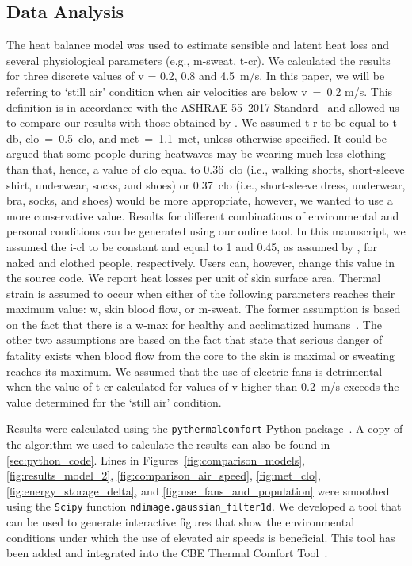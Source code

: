 \subsection{Data Analysis}\label{subsec:data-analysis}

The heat balance model was used to estimate sensible and latent heat loss and several physiological parameters (e.g., \ac{m-sweat}, \ac{t-cr}).
We calculated the results for three discrete values of \ac{v} = 0.2, 0.8 and 4.5~m/s.
In this paper, we will be referring to `still air' condition when air velocities are below \ac{v}~=~0.2 m/s.
This definition is in accordance with the ASHRAE 55--2017 Standard~\cite{ashrae552017} and allowed us to compare our results with those obtained by .
We assumed \ac{t-r} to be equal to \ac{t-db}, \ac{clo}~=~0.5~clo, and \ac{met}~=~1.1~met, unless otherwise specified.
It could be argued that some people during heatwaves may be wearing much less clothing than that, hence, a value of \ac{clo} equal to 0.36~clo (i.e., walking shorts, short-sleeve shirt, underwear, socks, and shoes) or 0.37~clo (i.e., short-sleeve dress, underwear, bra, socks, and shoes) would be more appropriate, however, we wanted to use a more conservative value.
Results for different combinations of environmental and personal conditions can be generated using our online tool.
In this manuscript, we assumed the \ac{i-cl} to be constant and equal to 1 and 0.45, as assumed by , for naked and clothed people, respectively.
Users can, however, change this value in the source code.
We report heat losses per unit of skin surface area.
Thermal strain is assumed to occur when either of the following parameters reaches their maximum value: \ac{w}, skin blood flow, or \ac{m-sweat}.
The former assumption is based on the fact that there is a \ac{w-max} for healthy and acclimatized humans~\cite{ASHRA2017}.
The other two assumptions are based on the fact that  state that serious danger of fatality exists when blood flow from the core to the skin is maximal or sweating reaches its maximum.
We assumed that the use of electric fans is detrimental when the value of \ac{t-cr} calculated for values of \ac{v} higher than 0.2~m/s exceeds the value determined for the `still air' condition.

Results were calculated using the  \verb|pythermalcomfort| Python package~\cite{Tartarini2020a}.
A copy of the algorithm we used to calculate the results can also be found in \ref{sec:python_code}.
Lines in Figures~\ref{fig:comparison_models}, \ref{fig:results_model_2}, \ref{fig:comparison_air_speed}, \ref{fig:met_clo}, \ref{fig:energy_storage_delta}, and \ref{fig:use_fans_and_population} were smoothed using the \verb|Scipy| function \verb|ndimage.gaussian_filter1d|.
We developed a tool that can be used to generate interactive figures that show the environmental conditions under which the use of elevated air speeds is beneficial.
This tool has been added and integrated into the CBE Thermal Comfort Tool~\cite{Tartarini2020}.

